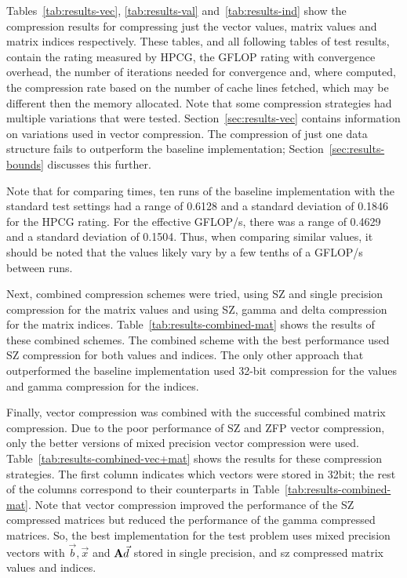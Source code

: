 Tables~\ref{tab:results-vec}, \ref{tab:results-val} and~\ref{tab:results-ind} show the compression results for compressing just the vector values, matrix values and matrix indices respectively.
These tables, and all following tables of test results, contain the rating measured by HPCG, the GFLOP rating with convergence overhead, the number of iterations needed for convergence and, where computed, the compression rate based on the number of cache lines fetched, which may be different then the memory allocated.
Note that some compression strategies had multiple variations that were tested.
Section~\ref{sec:results-vec} contains information on variations used in vector compression.
The compression of just one data structure fails to outperform the baseline implementation; Section~\ref{sec:results-bounds} discusses this further.






Note that for comparing times, ten runs of the baseline implementation with the standard test settings had a range of 0.6128 and a standard deviation of 0.1846 for the HPCG rating.
For the effective GFLOP/s, there was a range of 0.4629 and a standard deviation of 0.1504.
Thus, when comparing similar values, it should be noted that the values likely vary by a few tenths of a GFLOP/s between runs.

Next, combined compression schemes were tried, using SZ and single precision compression for the matrix values and using SZ, gamma and delta compression for the matrix indices.
Table~\ref{tab:results-combined-mat} shows the results of these combined schemes.
The combined scheme with the best performance used SZ compression for both values and indices.
The only other approach that outperformed the baseline implementation used 32-bit compression for the values and gamma compression for the indices.



Finally, vector compression was combined with the successful combined matrix compression.
Due to the poor performance of SZ and ZFP vector compression, only the better versions of mixed precision vector compression were used.
Table~\ref{tab:results-combined-vec+mat} shows the results for these compression strategies.
The first column indicates which vectors were stored in 32bit; the rest of the columns correspond to their counterparts in Table~\ref{tab:results-combined-mat}.
Note that vector compression improved the performance of the SZ compressed matrices but reduced the performance of the gamma compressed matrices.
So, the best implementation for the test problem uses mixed precision vectors with \(\vec{b}, \vec{x}\) and \(\mathbf{A}\vec{d}\) stored in single precision, and sz compressed matrix values and indices.

